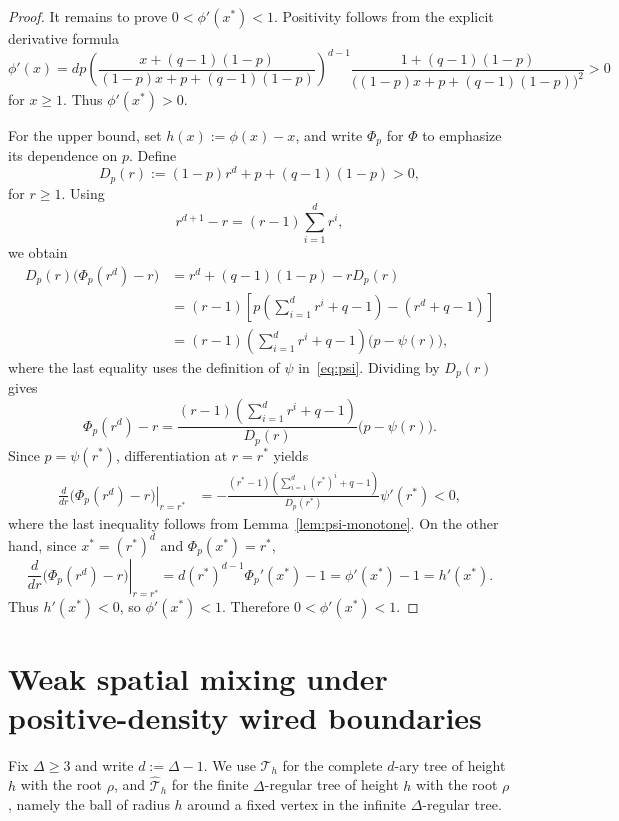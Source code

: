 \documentclass[11pt]{amsart}
\theoremstyle{plain}
\theoremstyle{definition}
\theoremstyle{remark}
\newcommand{\dary}{\mathcal T_h}
\newcommand{\dreg}{\widehat {\mathcal T}_h}
\begin{document}
\begin{proof}
It remains to prove \(0<\phi'(x^*)<1\). Positivity follows from the explicit derivative formula
\[
\phi'(x)
=
d p
\left(
\frac{
    x+(q-1)(1-p)
}{
    (1-p)x+p+(q-1)(1-p)
}
\right)^{d-1}
\frac{
    1+(q-1)(1-p)
}{
    \bigl((1-p)x+p+(q-1)(1-p)\bigr)^2
} > 0
\] 
for $x\ge1$. Thus \(\phi'(x^*)>0\).

For the upper bound, set $h(x):=\phi(x)-x$, and write $\Phi_p$ for $\Phi$ to emphasize its dependence on $p$. Define
\[
    D_p(r)
    :=
    (1-p)r^d+p+(q-1)(1-p)>0,
\]
for $r\ge1$. Using
\[
    r^{d+1}-r
    =
    (r-1)\sum_{i=1}^d r^i,
\]
we obtain
\[
\begin{aligned}
    D_p(r)\bigl(\Phi_p(r^d)-r\bigr)
    &=
    r^d+(q-1)(1-p)-rD_p(r)
    \\
    &=
    (r-1)
    \left[
        p\left(\sum_{i=1}^d r^i+q-1\right)
        -(r^d+q-1)
    \right]
    \\
    &=
    (r-1)
    \left(\sum_{i=1}^d r^i+q-1\right)
    \bigl(p-\psi(r)\bigr),
\end{aligned}
\]
where the last equality uses the definition of $\psi$ in~\eqref{eq:psi}. Dividing by $D_p(r)$ gives
\[
    \Phi_p(r^d)-r
    =
    \frac{
        (r-1)\left(\sum_{i=1}^d r^i+q-1\right)
    }{
        D_p(r)
    }
    \bigl(p-\psi(r)\bigr).
\]
Since $p=\psi(r^*)$, differentiation at $r=r^*$ yields
\[
\begin{aligned}
    \left.
    \frac{d}{dr}
    \bigl(\Phi_p(r^d)-r\bigr)
    \right|_{r=r^*}
    &=-
    \frac{
        (r^*-1)\left(\sum_{i=1}^d (r^*)^i+q-1\right)
    }{
        D_p(r^*)
    }
    \psi'(r^*)
    <0,
\end{aligned}
\]
where the last inequality follows from Lemma~\ref{lem:psi-monotone}. On the other hand, since $x^*=(r^*)^d$ and $\Phi_p(x^*)=r^*$,
\[
    \left.
    \frac{d}{dr}
    \bigl(\Phi_p(r^d)-r\bigr)
    \right|_{r=r^*}
    =
    d(r^*)^{d-1}\Phi_p'(x^*)-1
    =
    \phi'(x^*)-1
    =
    h'(x^*).
\]
Thus $h'(x^*)<0$, so $\phi'(x^*)<1$. Therefore $0<\phi'(x^*)<1$.
\end{proof}

\section{Weak spatial mixing under positive-density wired boundaries}
\label{sec:wsm}

Fix $\Delta\ge3$ and write $d:=\Delta-1$. We use $\dary$ for the complete $d$-ary tree of height $h$ with the root $\rho$, and $\dreg$ for the finite $\Delta$-regular tree of height $h$ with the root $\rho$, namely the ball of radius $h$ around a fixed vertex in the infinite $\Delta$-regular tree.
\end{document}
